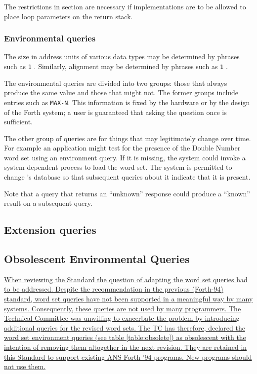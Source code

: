 The restrictions in section 
are necessary if implementations are to be allowed to place loop
parameters on the return stack.

\addtocounter{subsubsection}{2}
\subsubsection{Environmental queries} %

The size in address units of various data types may be determined by
phrases such as \texttt{1} . Similarly, alignment may be
determined by phrases such as \texttt{1} .

The environmental queries are divided into two groups: those that
always produce the same value and those that might not. The former
groups include entries such as \texttt{MAX-N}. This information is
fixed by the hardware or by the design of the Forth system; a user
is guaranteed that asking the question once is sufficient.

The other group of queries
are for things that may legitimately change over time. For example an
application might test for the presence of the Double Number word set
using an environment query.  If it is missing, the system could invoke
a system-dependent process to load the word set. The system is permitted
to change 's database so that subsequent queries about
it indicate that it is present.

Note that a query that returns an ``unknown'' response could produce
a ``known'' result on a subsequent query.

\subsection{Extension queries}

\cbstart{}%
\subsection{Obsolescent Environmental Queries}
\label{rat:obsolet}

\uline{%
When reviewing the Standard the question of adapting the word set
queries had to be addressed.  Despite the recommendation in the
previous (Forth-94) standard, word set queries have not been
supported in a meaningful way by many systems.  Consequently, these
queries are not used by many programmers.  The Technical Committee
was unwilling to exacerbate the problem by introducing additional
queries for the revised word sets.  The TC has therefore, declared
the word set environment queries (see table \ref{table:obsolete}) as
obsolescent with the intention of removing them altogether in the
next revision.
They are retained in this Standard to support existing ANS Forth '94
programs.  New programs should not use them.
}
\cbend

